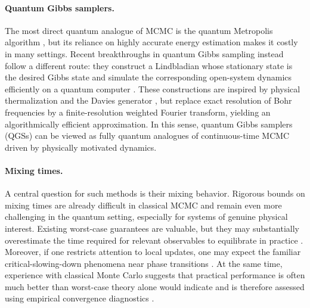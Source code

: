 \documentclass[showpacs,amsmath,amssymb,twocolumn,prx,superscriptaddress,10pt,aps,nofootinbib]{revtex4-2}
\begin{document}
\paragraph{Quantum Gibbs samplers.} The most direct quantum analogue of MCMC is the quantum Metropolis algorithm \cite{temme2011quantum}, but its reliance on highly accurate energy estimation makes it costly in many settings. Recent breakthroughs in quantum Gibbs sampling instead follow a different route: they construct a Lindbladian whose stationary state is the desired Gibbs state and simulate the corresponding open-system dynamics efficiently on a quantum computer \cite{chen2025efficient,Chen2023b,Ding2024,Ding2025}. These constructions are inspired by physical thermalization and the Davies generator \cite{davies1974markovian,davies1976markovian}, but replace exact resolution of Bohr frequencies by a finite-resolution weighted Fourier transform, yielding an algorithmically efficient approximation. In this sense, quantum Gibbs samplers (QGSs) can be viewed as fully quantum analogues of continuous-time MCMC driven by physically motivated dynamics.

\paragraph{Mixing times.} A central question for such methods is their mixing behavior. Rigorous bounds on mixing times are already difficult in classical MCMC and remain even more challenging in the quantum setting, especially for systems of genuine physical interest. Existing worst-case guarantees are valuable, but they may substantially overestimate the time required for relevant observables to equilibrate in practice \cite{Temme2013,Kastoryano2013,Kastoryano2016,Capel2021,bardet2023rapid,ding2024polynomial,rouze2024optimal,rouze2025efficient,kochanowski2025rapid,tong2025fast,vsmid2025polynomial,vsmid2025rapid,bergamaschi2025quantum,Becker2026a,Becker2026b}. Moreover, if one restricts attention to local updates, one may expect the familiar critical-slowing-down phenomena near phase transitions \cite{wolff1989critical,sokal1991beat}. At the same time, experience with classical Monte Carlo suggests that practical performance is often much better than worst-case theory alone would indicate and is therefore assessed using empirical convergence diagnostics \cite{Vivekananda2019,HandbookMCMC2011}.
\end{document}
